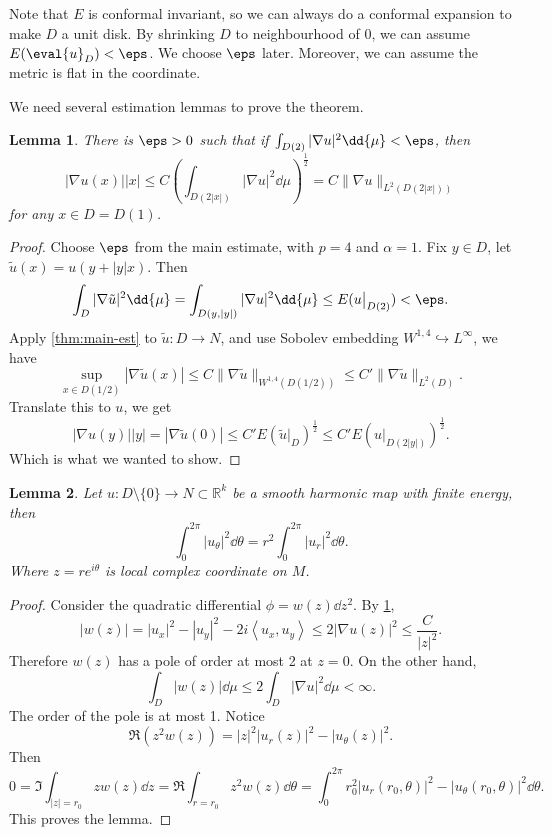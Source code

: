 \documentclass[UTF8,12pt]{article}
\theoremstyle{plain}\newtheorem{theorem}{Theorem}
\theoremstyle{definition}\newtheorem{definition}[theorem]{Definition}
\theoremstyle{definition}\newtheorem{example}[theorem]{Example}
\theoremstyle{plain}\newtheorem{axiom}[theorem]{Axiom}
\theoremstyle{plain}\newtheorem{assertion}[theorem]{Assertion}
\theoremstyle{plain}\newtheorem{corollary}[theorem]{Corollary}
\theoremstyle{plain}\newtheorem{lemma}[theorem]{Lemma}
\theoremstyle{plain}\newtheorem{proposition}[theorem]{Proposition}
\theoremstyle{plain}\newtheorem{prop}[theorem]{Proposition}
\theoremstyle{plain}\newtheorem{conjecture}[theorem]{Conjecture}
\theoremstyle{plain}\newtheorem{conj}[theorem]{Conjecture}
\theoremstyle{plain}\newtheorem{problem}[theorem]{Problem}
\theoremstyle{remark}\newtheorem{notation}[theorem]{Notation}
\theoremstyle{definition}\newtheorem*{question}{Question}
\theoremstyle{definition}\newtheorem*{answer}{Answer}
\theoremstyle{definition}\newtheorem*{goal}{Goal}
\theoremstyle{plain}\newtheorem*{application}{Application}
\theoremstyle{plain}\newtheorem*{exercise}{Exercise}
\theoremstyle{remark}\newtheorem*{remark}{Remark}
\theoremstyle{remark}\newtheorem*{note}{\small{Note}}
\numberwithin{equation}{section}
\numberwithin{theorem}{section}
\numberwithin{figure}{section}
\begin{document}
Note that \(E\) is conformal invariant, so we can always do a conformal expansion
to make \(D\) a unit disk. By shrinking \(D\) to neighbourhood of 0, we can assume
\(E(\eval{u}_{D})<\eps\). We choose \(\eps\) later. Moreover, we can assume the
metric is flat in the coordinate.

We need several estimation lemmas to prove the theorem.
\begin{lemma}\label{lem:sup-est}
    There is \(\eps>0\) such that if \(\int_{D(2)}|\nabla u|^2\dd{\mu}<\eps\), then \[
        |\nabla u(x)||x|
        \le C\left(\int_{D(2|x|)}|\nabla u|^2\dd{\mu}\right)^{\frac{1}{2}}
        =C\|\nabla u\|_{L^2(D(2|x|))}
    \] for any \(x\in D=D(1)\).
\end{lemma}
\begin{proof}
    Choose \(\eps\) from the main estimate, with \(p=4\) and \(\alpha=1\). Fix
    \(y\in D\), let \(\tilde{u}(x)=u(y+|y|x)\). Then \[
        \int_{D}|\nabla\tilde{u}|^2\dd{\mu}
        =\int_{D(y,|y|)}|\nabla u|^2\dd{\mu}
        \le E(u\big|_{D(2)})<\eps
    .\] Apply \cref{thm:main-est} to \(\tilde{u}\colon D\to N\), and use Sobolev
    embedding \(W^{1,4}\hookrightarrow L^\infty\), we have \[
        \sup_{x\in D(1/2)}|\nabla \tilde{u}(x)|
        \le C\|\nabla \tilde{u}\|_{W^{1,4}(D(1/2))}
        \le C'\|\nabla \tilde{u}\|_{L^2(D)}
    .\] Translate this to \(u\), we get \[
        |\nabla u(y)||y|=|\nabla\tilde{u}(0)|
        \le C'E\left(\tilde{u}\big|_{D}\right)^{\frac{1}{2}}
        \le C'E\left(u\big|_{D(2|y|)}\right)^{\frac{1}{2}}
    .\] Which is what we wanted to show.
\end{proof}
\begin{lemma}\label{lem:circle-integral}
    Let \(u\colon D\setminus\{0\}\to N\subset \mathbb{R}^k\) be a smooth harmonic
    map with finite energy, then \[
        \int_{0}^{2\pi}|u_\theta|^2\dd{\theta}
        =r^2 \int_{0}^{2\pi}|u_r|^2\dd{\theta}
    .\] Where \(z=re^{i\theta}\) is local complex coordinate on \(M\).
\end{lemma}
\begin{proof}
    Consider the quadratic differential \(\phi=w(z)\dd{z}^2\). By
    \cref{lem:sup-est}, \[
        |w(z)|=|u_x|^2-|u_y|^2-2i\left<u_x,u_y\right>\le 2|\nabla u(z)|^2
        \le \frac{C}{|z|^2}
    .\] Therefore \(w(z)\) has a pole of order at most 2 at \(z=0\).
    On the other hand, \[
        \int_{D}|w(z)|\dd{\mu}\le 2\int_{D}|\nabla u|^2\dd{\mu}<\infty
    .\] The order of the pole is at most 1. Notice \[
        \Re(z^2 w(z))=|z|^2|u_r(z)|^2-|u_\theta(z)|^2
    .\] Then \[
        0=\Im\int_{|z|=r_0}zw(z)\dd{z}
        =\Re \int_{r=r_0}z^2w(z)\dd{\theta}
        =\int_{0}^{2\pi}r_0^2|u_r(r_0,\theta)|^2-|u_\theta(r_0,\theta)|^2\dd{\theta}
    .\] This proves the lemma.
\end{proof}
\end{document}
